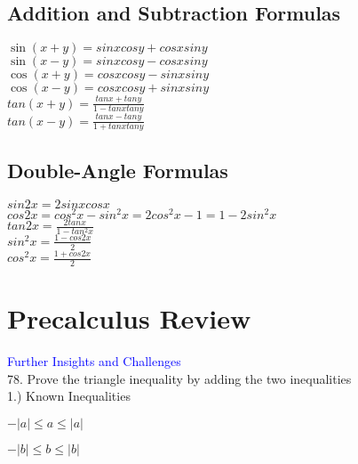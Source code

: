 \documentclass{article}
\begin{document}
	\subsection*{Addition and Subtraction Formulas}
		\begin{center}
		$\sin(x + y) = sinxcosy + cosxsiny$\\
		\vspace{10pt}
		$\sin(x - y) = sinxcosy - cosxsiny$\\
		\vspace{10pt}
		$\cos(x + y) = cosxcosy - sinxsiny$\\
		\vspace{10pt}
		$\cos(x - y) = cosxcosy + sinxsiny$\\
		\vspace{10pt}
		$tan(x + y) = \frac{tanx + tany}{1 - tanxtany}$\\
		\vspace{10pt}
		$tan(x - y) = \frac{tanx - tany}{1 + tanxtany}$
		\end{center}
	\subsection*{Double-Angle Formulas}
		\begin{center}
		$sin2x = 2sinxcosx$\\
		\vspace{10pt}
		$cos2x = cos^2x - sin^2x = 2cos^2x-1 = 1-2sin^2x$\\
		\vspace{10pt}
		$tan2x = \frac{2tanx}{1 - tan^2x}$\\
		\vspace{10pt}
		$sin^2x = \frac{1 - cos2x}{2}$\\
		\vspace{10pt}
		$cos^2x = \frac{1+cos2x}{2}$
		\end{center}

\section* {Precalculus Review}

\textcolor{blue}{Further Insights and Challenges} \\

78. Prove the triangle inequality by adding the two inequalities\\

1.) Known Inequalities\\
\begin{center}$-\left|a\right| \leq a \leq \left|a\right|$\\\end{center}
\begin{center}$-\left|b\right| \leq b \leq \left|b\right|$\\\end{center}
\end{document}
